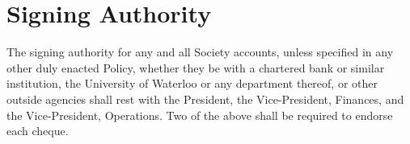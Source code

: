 \section{Signing Authority}
The signing authority for any and all Society accounts, unless specified in any
other duly enacted Policy, whether they be with a chartered bank or similar
institution, the University of Waterloo or any department thereof, or other
outside agencies shall rest with the President, the Vice-President, Finances,
and the Vice-President, Operations. Two of the above shall be required to
endorse each cheque.
